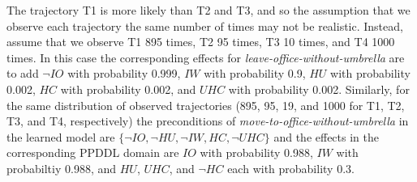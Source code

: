 \documentclass[letterpaper]{article} %
\newcommand{\movetoofficewithoutumbrella}{\textit{move-to-office-without-umbrella}\xspace}
\newcommand{\leaveofficewithoutumbrella}{\textit{leave-office-without-umbrella}\xspace}
\newcommand{\getumbrella}{\textit{get-umbrella}\xspace}
\begin{document}
The trajectory T1 is more likely than T2 and T3, and so the assumption that we observe each trajectory the same number of times may not be realistic. 
Instead, assume that we observe T1 895 times, T2 95 times, T3 10 times, and T4 1000 times. 
In this case the corresponding effects for \leaveofficewithoutumbrella 
are to add $\neg IO$ with probability 0.999,
$IW$ with probability 0.9,
$HU$ with probability 0.002,
$HC$ with probability 0.002, 
and $UHC$ with probability 0.002. 
Similarly, for the same distribution of observed trajectories (895, 95, 19, and 1000 for T1, T2, T3, and T4, respectively) the preconditions of \movetoofficewithoutumbrella in the learned model are 
$\{\neg IO, \neg HU, \neg IW, HC, \neg UHC\}$ and the 
effects in the corresponding PPDDL domain are 
$IO$ with probability 0.988, 
$IW$ with probabiltiy 0.988, 
and $HU$, $UHC$, and $\neg HC$ each with probability 0.3. 







\end{document}
